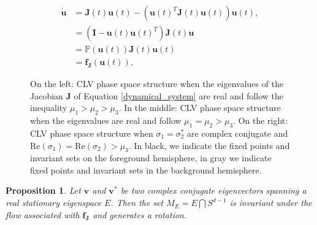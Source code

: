 \documentclass[10pt,a4paper]{amsart}
\newtheorem{proposition}{Proposition}
\begin{document}
\begin{align} \label{eq_clv projeciton form}
\dot{{\mathbf{u}}} &= \mathbf{J}(t){\mathbf{u}}(t) - \left({{\mathbf{u}}(t)^T \mathbf{J}(t){\mathbf{u}}(t)}\right){\mathbf{u}}(t), \nonumber \\ 
& = \left( \mathbf{I} - \mathbf{u}(t)\mathbf{u}(t)^T \right)\mathbf{J}(t)\mathbf{u} \nonumber \\ 
& = \mathbb{P}(\mathbf{u}(t))\mathbf{J}(t)\mathbf{u}(t) \nonumber \\ 
&=\mathbf{f}_\mathbf{J}(\mathbf{u}(t)),
\end{align}

\begin{figure}
    \centering
    
    \caption{On the left: CLV phase space structure when the eigenvalues of the Jacobian $\mathbf{J}$ of Equation \eqref{dynamical_system} are real and follow the inequality $\mu_1 > \mu_2 > \mu_3$. In the middle: CLV phase space structure when the eigenvalues are real and follow $\mu_1 = \mu_2>\mu_3$. On the right: CLV phase space structure when $\sigma_1 = \sigma_2^*$ are complex conjugate and $\mathrm{Re}(\sigma_1) = \mathrm{Re}(\sigma_2) > \mu_3$. In black, we indicate the fixed points and invariant sets on the foreground hemisphere, in gray we indicate fixed points and invariant sets in the background hemisphere.}
    \label{fig:CLV_sphere}
\end{figure}

\begin{proposition}
\label{proposition 3}
Let $\mathbf{v}$ and ${\mathbf{v}^*}$ be two complex conjugate eigenvectors spanning a real stationary eigenspace $E$. Then the set $M_E = E \bigcap S^{d-1}$ is invariant under the flow associated with $\mathbf{f}_{\mathbf{J}}$ and generates a rotation.
\end{proposition}
\end{document}
